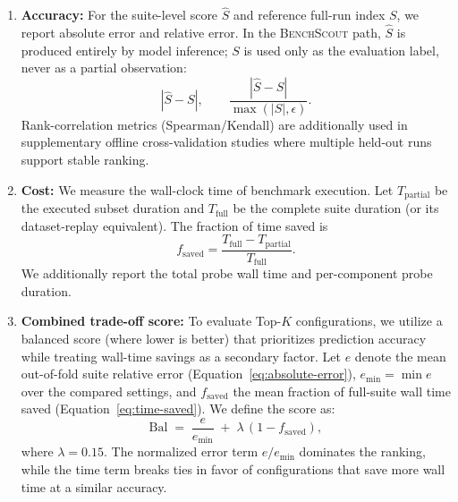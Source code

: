 \documentclass[sigplan,10pt]{acmart}
\newcommand{\ourmethod}{\textsc{BenchScout}\xspace}
\begin{document}
\begin{enumerate}
    \item \textbf{Accuracy:} For the suite-level score \(\hat{S}\) and reference full-run index \(S\), we report absolute error and relative error.
    In the \ourmethod{} path, \(\hat{S}\) is produced entirely by model inference; \(S\) is used only as the evaluation label, never as a partial observation:
    \begin{equation}
    \label{eq:absolute-error}
    |\hat{S} - S|, \qquad
    \frac{|\hat{S} - S|}{\max(|S|, \epsilon)}.
    \end{equation}
    Rank-correlation metrics (Spearman/Kendall) are additionally used in supplementary offline cross-validation studies where multiple held-out runs support stable ranking.
    
    \item \textbf{Cost:} We measure the wall-clock time of benchmark execution. Let $T_{\mathrm{partial}}$ be the executed subset duration and $T_{\mathrm{full}}$ be the complete suite duration (or its dataset-replay equivalent). The fraction of time saved is
    \begin{equation}
    \label{eq:time-saved}
    f_{\mathrm{saved}} = \frac{T_{\mathrm{full}} - T_{\mathrm{partial}}}{T_{\mathrm{full}}}.
    \end{equation}
    We additionally report the total probe wall time and per-component probe duration.
    
    \item \textbf{Combined trade-off score:} To evaluate Top-$K$ configurations, we utilize a balanced score (where lower is better) that prioritizes prediction accuracy while treating wall-time savings as a secondary factor. Let $e$ denote the mean out-of-fold suite relative error (Equation~\ref{eq:absolute-error}), $e_{\min} = \min e$ over the compared settings, and $f_{\mathrm{saved}}$ the mean fraction of full-suite wall time saved (Equation~\ref{eq:time-saved}). We define the score as:
    \begin{equation}
    \label{eq:balanced-score}
    \mathrm{Bal} \;=\; \frac{e}{e_{\min}} \;+\; \lambda \,(1 - f_{\mathrm{saved}}),
    \end{equation}
    where \(\lambda = 0.15\). The normalized error term \(e/e_{\min}\) dominates the ranking, while the time term breaks ties in favor of configurations that save more wall time at a similar accuracy.
    

\end{enumerate}
\end{document}
